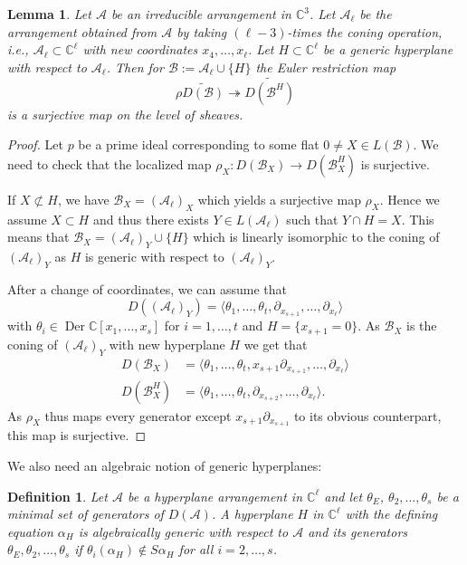 \documentclass[a4paper,11pt]{amsart}
\def\CC{{\mathbb{C}}}%
\def\C{{\mathbb{C}}}%
\def\A{{\mathcal{A}}}%
\def\B{{\mathcal{B}}}%
\def\C{{\mathcal{C}}}%
\DeclareMathOperator{\Der}{Der}
\numberwithin{equation}{section}
\newtheorem{lemma}[theorem]{Lemma}
\newtheorem{define}[theorem]{Definition}
\theoremstyle{remark}
\begin{document}
\begin{lemma}\label{lem:surjectivity}
	Let $\A$ be an irreducible arrangement in $\CC^3$. Let $\A_\ell$ be the arrangement obtained from $\A$ by taking $(\ell-3)$-times the coning operation, i.e., $\A_\ell \subset \CC^\ell$ with new coordinates $x_4,\ldots,x_\ell$.
	Let $H\subset \CC^\ell$ be a generic hyperplane with respect to $\A_\ell$.
	Then for $\B:=\A_\ell \cup \{H\}$ the Euler restriction map
	\[
	\rho \widetilde{D(\B)} \twoheadrightarrow \widetilde{D(\B^H)}
	\]
	is a surjective map on the level of sheaves.
\end{lemma}
\begin{proof}
	Let $p$ be a prime ideal corresponding to some flat $0\neq X\in L(\B)$.
	We need to check that the localized map $\rho_X : D(\B_X)\to D(\B_X^H)$ is surjective.
	
	If $X\not \subset H$, we have $\B_X = (\A_\ell)_X$ which yields a surjective map $\rho_X$.
	Hence we assume $X\subset H$ and thus there exists $Y\in L(\A_\ell)$ such that $Y\cap H = X$.
	This means that $\B_X = (\A_\ell)_Y\cup \{H\}$ which is linearly isomorphic to the coning of  $(\A_\ell)_Y$ as $H$ is generic with respect to  $(\A_\ell)_Y$.
	
	After a change of coordinates, we can assume that
	 \[
	 	D((\A_\ell)_Y) = \langle \theta_1,\dots,\theta_t,\partial_{x_{s+1}},\dots, \partial_{x_\ell}\rangle
	 \]
	 with $\theta_i \in \Der \CC\left[ x_1,\dots,x_s\right]$ for $i=1,\dots,t$ and $H=\{x_{s+1}=0\}$.
	 As  $\B_X$ is the coning of $(\A_\ell)_Y$ with new hyperplane $H$ we get that
	 \begin{align*}
	 	D(\B_X) &= \langle \theta_1,\dots,\theta_t,x_{s+1}\partial_{x_{s+1}},\dots, \partial_{x_\ell}\rangle \\ 
	 	D(\B_X^H)& = \langle \theta_1,\dots,\theta_t,\partial_{x_{s+2}},\dots, \partial_{x_\ell}\rangle.
	 \end{align*}
	 As $\rho_X$ thus maps every generator except $x_{s+1}\partial_{x_{s+1}}$ to its obvious counterpart, this map is surjective.
\end{proof}

We also need an algebraic notion of generic hyperplanes:

\begin{define}
	Let $\mathcal{A}$ be a hyperplane arrangement in $\CC^\ell$ and let $\theta_E$, $\theta_2, \ldots, \theta_s$ be a minimal set of generators of $D(\mathcal{A})$.
	A hyperplane $H$ in $\CC^\ell$ with the defining equation $\alpha_H$ is \emph{algebraically generic} with respect to $\mathcal{A}$ and its generators $\theta_E,\theta_2,\dots,\theta_s$ if $\theta_i(\alpha_H) \notin S\alpha_H$ for all $i=2,\ldots,s$.
\end{define}
\end{document}
